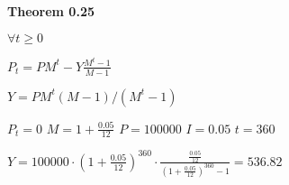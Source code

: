 \begin{enumerate}
            
            \textbf{Theorem 0.25}
            
            $\forall t \geq 0$
            
            
            $P_t=PM^t-Y\frac{M^t-1}{M-1}$
            
            
            $Y = PM^t(M-1)/(M^t-1)$
            
            $P_t = 0$
            $M = 1 + \frac{0.05}{12}$
            $P = 100000$
            $I = 0.05$
            $t = 360$
            
            $Y = 100000 \cdot (1 + \frac{0.05}{12})^{360} \cdot \frac{\frac{0.05}{12}}{(1 + \frac{0.05}{12})^{360} - 1} = 536.82$
            
\end{enumerate}